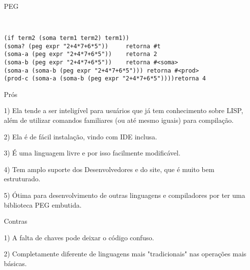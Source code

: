 \documentclass{beamer}
\begin{document}

\begin{frame}[fragile]{PEG}
\begin{verbatim}


(if term2 (soma term1 term2) term1))
(soma? (peg expr "2+4*7+6*5"))     retorna #t
(soma-a (peg expr "2+4*7+6*5"))    retorna 2
(soma-b (peg expr "2+4*7+6*5"))    retorna #<soma>
(soma-a (soma-b (peg expr "2+4*7+6*5"))) retorna #<prod>
(prod-c (soma-a (soma-b (peg expr "2+4*7+6*5"))))retorna 4
\end{verbatim}
\end{frame}


\begin{frame}{Prós}

1) Ela tende a ser inteligível para usuários que já tem conhecimento sobre LISP, além de utilizar comandos familiares (ou até mesmo iguais) para compilação.

2) Ela é de fácil instalação, vindo com IDE inclusa.

3) É uma linguagem livre e por isso facilmente modificável.

4) Tem amplo suporte dos Desenvolvedores e do site, que é muito bem estruturado.

5) Ótima para desenvolvimento de outras linguagens e compiladores por ter uma biblioteca PEG embutida.


\end{frame}
\begin{frame}{Contras}

1) A falta de chaves pode deixar o código confuso.

2) Completamente diferente de linguagens mais "tradicionais" nas operações mais básicas.


\end{frame}
\end{document}
